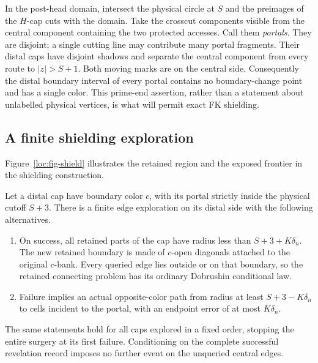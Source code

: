 In the post-head domain, intersect the physical circle at \(S\)
and the preimages of the \(H\)-cap cuts with the domain.
Take the crosscut components visible from the central component
containing the two protected accesses. Call them \emph{portals}.
They are disjoint; a single cutting line may contribute many
portal fragments. Their distal caps have disjoint shadows and
separate the central component from every route to
\(|z|>S+1\). Both moving marks are on the central side.
Consequently the distal boundary interval of every portal
contains no boundary-change point and has a single color.
This prime-end assertion, rather than a statement about
unlabelled physical vertices, is what will permit exact FK
shielding.

\subsection{A finite shielding exploration}

Figure~\ref{loc:fig-shield} illustrates the retained region and the
exposed frontier in the shielding construction.

\begin{lemma}
\label{loc:shield}
Let a distal cap have boundary color \(c\), with its portal
strictly inside the physical cutoff \(S+3\).
There is a finite edge exploration on its distal side with
the following alternatives.
\begin{enumerate}
\item On success, all retained parts of the cap have radius
less than \(S+3+K\delta_n\). The new retained boundary is
made of \(c\)-open diagonals attached to the original
\(c\)-bank. Every queried edge lies outside or on that
boundary, so the retained connecting problem has its
ordinary Dobrushin conditional law.
\item Failure implies an actual opposite-color path from
radius at least \(S+3-K\delta_n\) to cells incident to
the portal, with an endpoint error of at most
\(K\delta_n\).
\end{enumerate}
The same statements hold for all caps explored in a fixed
order, stopping the entire surgery at its first failure.
Conditioning on the complete successful revelation record
imposes no further event on the unqueried central edges.
\end{lemma}


